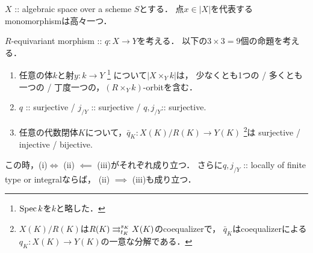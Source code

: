 \documentclass[a4paper, dvipdfmx]{jsarticle}
\begin{document}
\begin{Cor}
    $X$ :: algebraic space over a scheme $S$とする．
    点$x \in |X|$を代表するmonomorphismは高々一つ．
\end{Cor}

\begin{Prop}
    $R$-equivariant morphism :: $q \colon X \to Y$を考える．
    以下の$3 \times 3=9$個の命題を考える．
    {\samepage
    \begin{enumerate}
    \item
        任意の体$k$と射$y \colon k \to Y$ \footnote{$\operatorname{Spec} k$を$k$と略した．}
            について$|X \times_{Y} k|$は，\mnewline
        少なくとも1つの / 多くとも一つの / 丁度一つの，$(R \times_{Y} k)$-orbitを含む．
    \item
        $q$ :: surjective / $j_{/Y}$ :: surjective / $q, j_{/Y}$:: surjective.
    \item
        任意の代数閉体$K$について，$\bar{q}_K \colon X(K)/R(K) \to Y(K)$
        \footnote
            {
                $X(K)/R(K)$は$R(K) \mathrel{\mathop{\rightrightarrows}^{s_K}_{t_K}} X(K)$のcoequalizerで，
                $\bar{q}_K$はcoequalizerによる$q_K \colon X(K) \to Y(K)$の一意な分解である．
            }は \mnewline
        surjective / injective / bijective.
    \end{enumerate}
    }

    この時，(i)$ \iff$ (ii) $\impliedby$ (iii)がそれぞれ成り立つ．
    さらに$q, j_{/Y}$ :: locally of finite type or integralならば，
    (ii) $\implies$ (iii)も成り立つ．
\end{Prop}
\end{document}
